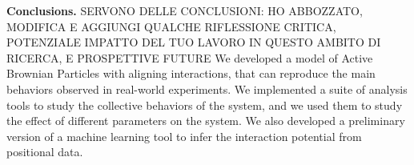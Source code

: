 \documentclass[a4paper, notitlepage]{report} %
\begin{document}
	\textbf{Conclusions.}
	SERVONO DELLE CONCLUSIONI: HO ABBOZZATO, MODIFICA E AGGIUNGI QUALCHE RIFLESSIONE CRITICA, POTENZIALE IMPATTO DEL TUO LAVORO IN QUESTO AMBITO DI RICERCA, E PROSPETTIVE FUTURE
	We developed a model of Active Brownian Particles with aligning interactions, that can reproduce the main behaviors observed in real-world experiments.
	We implemented a suite of analysis tools to study the collective behaviors of the system, and we used them to study the effect of different parameters on the system.
	We also developed a preliminary version of a machine learning tool to infer the interaction potential from positional data.


	\printbibliography
\end{document}
